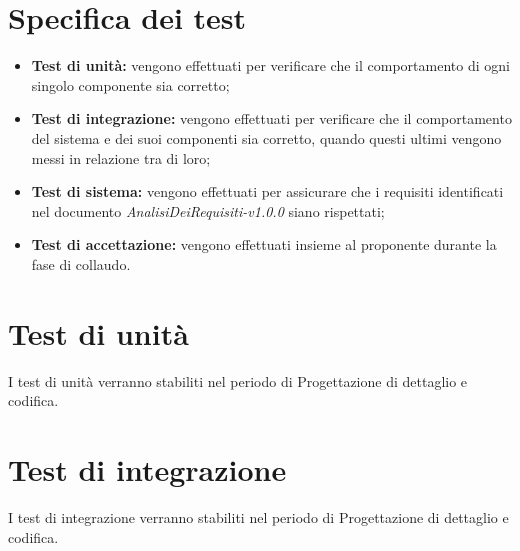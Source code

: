 \section{Specifica dei test}

\begin{itemize}
    \item \textbf{Test di unità:} vengono effettuati per verificare che il comportamento di ogni singolo componente sia corretto;
    \item \textbf{Test di integrazione:} vengono effettuati per verificare che il comportamento del sistema e dei suoi componenti sia corretto, quando questi ultimi vengono messi in relazione tra di loro;
    \item \textbf{Test di sistema:} vengono effettuati per assicurare che i requisiti identificati nel documento \textit{AnalisiDeiRequisiti-v1.0.0} siano rispettati;
    \item \textbf{Test di accettazione:} vengono effettuati insieme al proponente durante la fase di collaudo.
\end{itemize}
\section{Test di unità}
I test di unità verranno stabiliti nel periodo di Progettazione di dettaglio e codifica.

\section{Test di integrazione}
I test di integrazione verranno stabiliti nel periodo di Progettazione di dettaglio e codifica.


